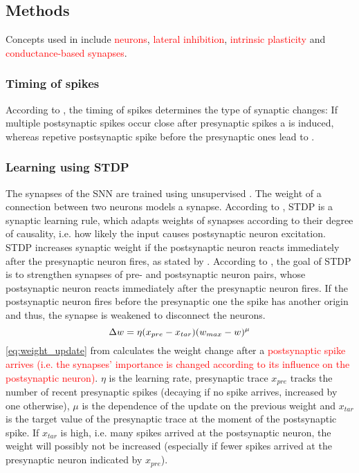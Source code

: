 \subsection{Methods}
\label{subsec:methods}

Concepts used in \cite{SNN} include \textcolor{red}{ neurons}, \textcolor{red}{lateral inhibition}, \textcolor{red}{intrinsic plasticity} and \textcolor{red}{conductance-based synapses}.

\subsubsection{Timing of spikes}
According to \cite{LTP_D_bio}, the timing of spikes determines the type of synaptic changes:
If multiple postsynaptic spikes occur close after presynaptic spikes a  is induced, 
whereas repetive postsynaptic spike before the presynaptic ones lead to .


\subsubsection{Learning using \ac{STDP}}
The synapses of the \ac{SNN} are trained using unsupervised . 
The weight of a connection between two neurons models a synapse.
According to \cite{STDP_like}, \ac{STDP} is a synaptic learning rule, which adapts weights of synapses according to their degree of causality, i.e. how likely the input causes postsynaptic neuron excitation.
\ac{STDP} increases synaptic weight if the postsynaptic neuron reacts immediately after the presynaptic neuron fires, as stated by \cite{object_detection_SNN}.
According to \cite{object_detection_SNN}, the goal of \ac{STDP} is to strengthen synapses of pre- and postsynaptic neuron pairs, whose postsynaptic neuron reacts immediately after the presynaptic neuron fires.
If the postsynaptic neuron fires before the presynaptic one the spike has another origin and thus, the synapse is weakened to disconnect the neurons.
%
\begin{equation}
    \centering
    \label{eq:weight_update}
    \Delta w = \eta (x_{pre} - x_{tar})(w_{max}-w)^\mu
\end{equation}
%
\autoref{eq:weight_update} from \cite{SNN} calculates the weight change after a \textcolor{red}{postsynaptic spike arrives (i.e. the synapses' importance is changed according to its influence on the postsynaptic neuron)}.
$\eta$ is the learning rate, presynaptic trace $x_{pre}$ tracks the number of recent presynaptic spikes (decaying if no spike arrives, increased by one otherwise), $\mu$ is the dependence of the update on the previous weight and $x_{tar}$ is the target value of the presynaptic trace at the moment of the postsynaptic spike.
If $x_{tar}$ is high, i.e. many spikes arrived at the postsynaptic neuron, the weight will possibly not be increased (especially if fewer spikes arrived at the presynaptic neuron indicated by  $x_{pre}$).

